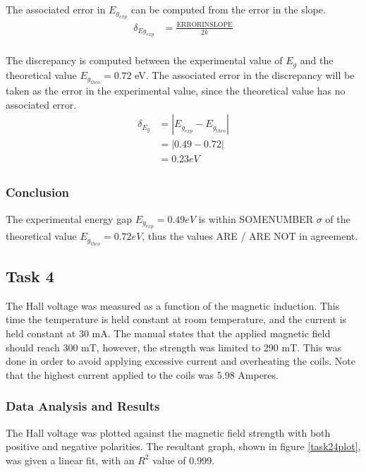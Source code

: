\documentclass[a4paper]{article}
\begin{document}
The associated error in $E_{g_{exp}}$ can be computed from the error in the slope.
\begin{align*}
\delta_{Eg_{exp}} &= \frac{\text{ERRORINSLOPE}}{2k} \\		
\end{align*}

The discrepancy is computed between the experimental value of $E_g$ and the theoretical value $E_{g_{theo}} = 0.72$ eV. The associated error in the discrepancy will be taken as the error in the experimental value, since the theoretical value has no associated error.
\begin{align*}
\delta_{E_g} &= | E_{g_{exp}} - E_{g_{theo}} | \\
		     &= | 0.49 - 0.72 | \\
		     &= 0.23 eV \\
\end{align*}

\subsubsection{Conclusion}
The experimental energy gap $E_{g_{exp}} = 0.49 eV$ is within SOMENUMBER $\sigma$ of the theoretical value $E_{g_{theo}} = 0.72 eV$, thus the values  ARE / ARE NOT in agreement.

\subsection{Task 4}

\qq The Hall voltage was measured as a function of the magnetic
induction. This time the temperature is held constant at room
temperature, and the current is held constant at 30 mA. The manual
states that the applied magnetic field should reach 300 mT,
however, the strength was limited to 290 mT. This was done in
order to avoid applying excessive current and overheating the coils. 
Note that the highest current applied to the coils was 5.98
Amperes.

\subsubsection{Data Analysis and Results}
\qq The Hall voltage was plotted against the magnetic field strength
with both positive and negative polarities. The resultant graph, shown in figure \ref{task24plot}, was
given a linear fit, with an $R^2$ value of 0.999.
\end{document}
